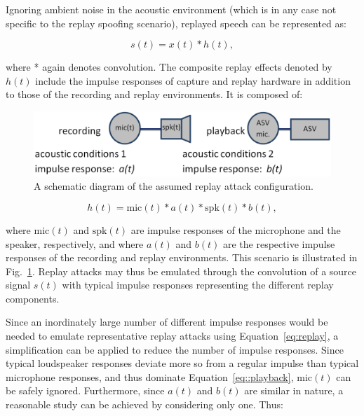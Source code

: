 Ignoring ambient noise in the acoustic environment (which is in any case not specific to the replay spoofing scenario), replayed speech can be represented as:


\begin{equation}
s(t) = x(t)*h(t),
\label{eq:replay}
\end{equation}


\noindent where * again denotes convolution.  The composite replay effects denoted by $h(t)$ include the impulse responses of capture and replay hardware in addition to those of the recording and replay environments.  It is composed of:


\begin{figure}
	\includegraphics[width=1\linewidth]{Figs/replay.png}
	\caption{A schematic diagram of the assumed replay attack configuration. %
}
	\label{fig::Replay}
\end{figure}

\begin{equation}
h(t) = \mathrm{mic}(t) * a(t) * \mathrm{spk}(t) * b(t),
\label{eq::playback}
\end{equation}


\noindent where $\mathrm{mic}(t)$ and $\mathrm{spk}(t)$ are impulse responses of the microphone and the speaker, respectively, and where $a(t)$ and $b(t)$ are the respective impulse responses of the recording and replay environments.  This scenario is illustrated in Fig.~\ref{fig::Replay}.  Replay attacks may thus be emulated through the convolution of a source signal $s(t)$ with typical impulse responses representing the different replay components.

Since an inordinately large number of different impulse responses would be needed to emulate representative replay attacks using Equation~\ref{eq:replay}, a simplification can be applied to reduce the number of impulse responses.  Since typical loudspeaker responses deviate more so from a regular impulse than typical microphone responses, and thus dominate Equation~\ref{eq::playback}, $\mathrm{mic}(t)$ can be safely ignored.  Furthermore, since $a(t)$ and $b(t)$ are similar in nature, a reasonable study can be achieved by considering only one.  Thus:

